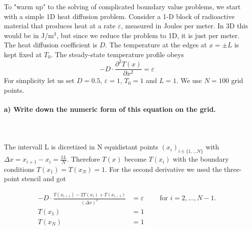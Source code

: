 To "warm up" to the solving of complicated boundary value problems, we
start with a simple 1D heat diffusion problem. Consider a 1-D block of
radioactive material that produces heat at a rate $\varepsilon$,
measured in Joules per meter. In 3D this would be in J/m$^3$, but
since we reduce the problem to 1D, it is just per meter. The heat
diffusion coefficient is $D$. The temperature at the edges at $x=\pm L$
is kept fixed at $T_0$. The steady-state temperature profile obeys
\begin{equation}
    -D\cdot\frac{\partial^2T(x)}{\partial x^2}=\varepsilon
    \label{eq:temp_diffusion_equation}
\end{equation}
For simplicity let us set $D=0.5$, $\varepsilon=1$, $T_0=1$ and $L=1$.
We use $N=100$ grid points.

\paragraph{
    a) Write down the numeric form of this equation on the grid.
} \ \\
    \\
    The intervall L is dicretized in N equidistant points $(x_i)_{i \in \{1, \dots N\}}$ with $\Delta x = x_{i+1}-x_i = \frac{2L}{N}$. Therefore $T(x)$ become $T(x_i)$ with the boundary conditions $T(x_1)=T(x_N)=1$. For the second derivative we used the three-point stencil and got
  \begin{comment}  If the temperature difference between two grid cells is expressed as
    $\Delta T$, and the two grid cells have a distance of
    $\Delta x=L/N$, then equation
    \ref{eq:temp_diffusion_equation} can be rewritten into discrete
    form as
\end{comment}

    \begin{align}
        -D\cdot\frac{T(x_{i+1}) - 2 T(x_i) + T(x_{i-1})}{(\Delta x)^2}&=\varepsilon \qquad \text{ for } i = 2, \dots, N-1.\\
        T(x_1) &= 1 \\
        T(x_N) &= 1
    \end{align}
